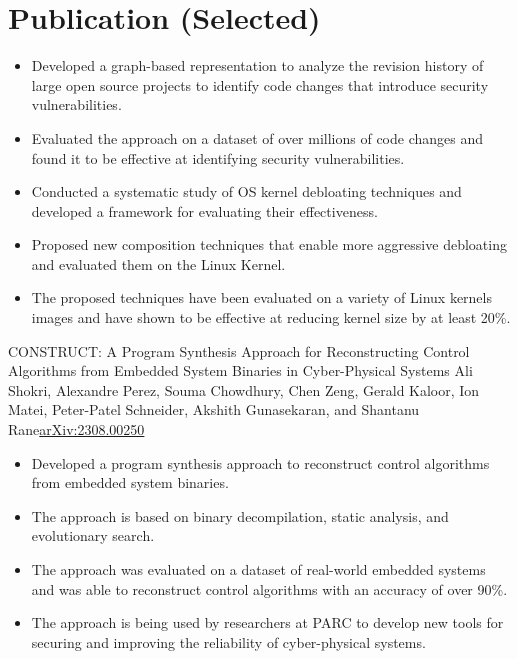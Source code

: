 \section{Publication (Selected)}
 {
    \begin{itemize}
        \item Developed a graph-based representation to analyze the revision
              history of large open source projects to identify code changes
              that introduce security vulnerabilities.
        \item Evaluated the approach on a dataset of over millions of code
              changes and found it to be effective at identifying security
              vulnerabilities.
    \end{itemize}
}

 {
    \begin{itemize}
        \item Conducted a systematic study of OS kernel debloating techniques
              and developed a framework for evaluating their effectiveness.
        \item Proposed new composition techniques that enable more aggressive
              debloating and evaluated them on the Linux Kernel.
        \item The proposed techniques have been evaluated on a variety of Linux
              kernels images and have shown to be effective at reducing kernel
              size by at least 20\%.
    \end{itemize}
}

{CONSTRUCT: A Program Synthesis Approach for Reconstructing Control
    Algorithms from Embedded System Binaries in Cyber-Physical Systems} {Ali
    Shokri, Alexandre Perez, Souma Chowdhury, Chen Zeng, Gerald Kaloor, Ion
    Matei, Peter-Patel Schneider, Akshith Gunasekaran, and Shantanu
    Rane}{\href{https://arxiv.org/pdf/2308.00250.pdf}{arXiv:2308.00250}}{} {
    \begin{itemize}
        \item Developed a program synthesis approach to reconstruct control
              algorithms from embedded system binaries.
        \item The approach is based on binary decompilation, static analysis,
              and evolutionary search.
        \item The approach was evaluated on a dataset of real-world embedded
              systems and was able to reconstruct control algorithms with an
              accuracy of over 90\%.
        \item The approach is being used by researchers at PARC to develop new
              tools for securing and improving the reliability of cyber-physical
              systems.
    \end{itemize}
}

